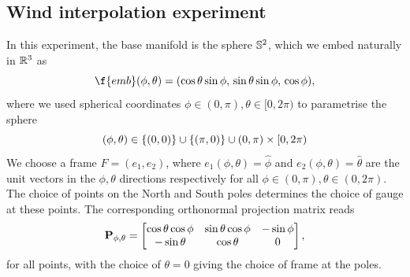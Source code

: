 \subsection*{Wind interpolation experiment}
In this experiment, the base manifold is the sphere $\bb{S}^2$, which we embed naturally in $\mathbb{R}^3$ as \[ \f{emb}(\phi, \theta) = (\cos{\theta} \sin{\phi}, \,\sin{\theta} \sin{\phi}, \,\cos{\phi}), \] where we used spherical coordinates $\phi \in (0, \pi), \theta \in [0, 2 \pi)$ to parametrise the sphere \[ (\phi, \theta) \in \{(0,0)\} \cup \{(\pi, 0)\} \cup (0, \pi) \times [0, 2 \pi) \] We choose a frame $F = (e_1, e_2)$, where $e_1(\phi, \theta) = \hat{\phi}$ and $e_2(\phi, \theta) = \hat{\theta}$ are the unit vectors in the $\phi, \theta$ directions respectively for all $\phi \in (0, \pi), \theta \in (0, 2 \pi)$.
The choice of points on the North and South poles determines the choice of gauge at these points.
The corresponding orthonormal projection matrix reads \[\label{sphere-projection} \m{P}_{\phi, \theta} = \begin{bmatrix} \cos{\theta} \cos{\phi} & \sin{\theta}\cos{\phi} & -\sin{\phi} \\ -\sin{\theta} & \cos{\theta} & 0 \end{bmatrix}, \] for all points, with the choice of $\theta=0$ giving the choice of frame at the poles.

